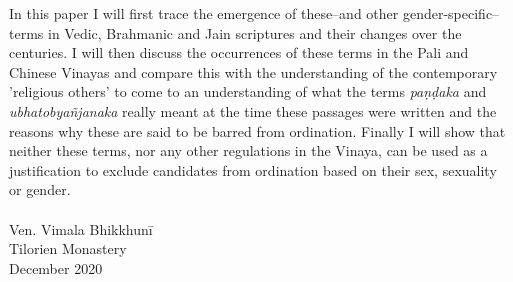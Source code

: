 In this paper I will first trace the emergence of these--and other gender-specific--terms in Vedic, Brahmanic and Jain scriptures and their changes over the centuries. I will then discuss the occurrences of these terms in the Pali and Chinese Vinayas and compare this with the understanding of the contemporary 'religious others' to come to an understanding of what the terms {\em paṇḍaka} and {\em ubhatob­yañ­janaka} really meant at the time these passages were written and the reasons why these are said to be barred from ordination. Finally I will show that neither these terms, nor any other regulations in the Vinaya, can be used as a justification to exclude candidates from ordination based on their sex, sexuality or gender.\\
\\
Ven. Vimala Bhikkhunī\\
Tilorien Monastery\\
December 2020\\


